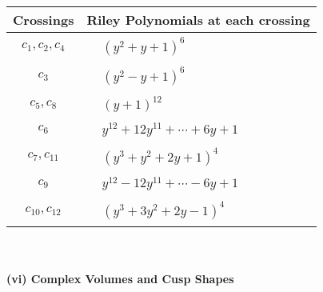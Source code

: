 \documentclass[1p]{elsarticle_modified}
\theoremstyle{definition}
\begin{document}
\begin{tabular}{m{50pt}|m{274pt}}
Crossings & \hspace{64pt}Riley Polynomials at each crossing \\
\hline $$\begin{aligned}c_{1},c_{2},c_{4}\end{aligned}$$&$\begin{aligned}
&(y^2+y+1)^6
\end{aligned}$\\
\hline $$\begin{aligned}c_{3}\end{aligned}$$&$\begin{aligned}
&(y^2- y+1)^6
\end{aligned}$\\
\hline $$\begin{aligned}c_{5},c_{8}\end{aligned}$$&$\begin{aligned}
&(y+1)^{12}
\end{aligned}$\\
\hline $$\begin{aligned}c_{6}\end{aligned}$$&$\begin{aligned}
&y^{12}+12 y^{11}+\cdots+6 y+1
\end{aligned}$\\
\hline $$\begin{aligned}c_{7},c_{11}\end{aligned}$$&$\begin{aligned}
&(y^3+y^2+2 y+1)^4
\end{aligned}$\\
\hline $$\begin{aligned}c_{9}\end{aligned}$$&$\begin{aligned}
&y^{12}-12 y^{11}+\cdots-6 y+1
\end{aligned}$\\
\hline $$\begin{aligned}c_{10},c_{12}\end{aligned}$$&$\begin{aligned}
&(y^3+3 y^2+2 y-1)^4
\end{aligned}$\\
\hline
\end{tabular}\\~\\
\newpage\flushleft \textbf{(vi) Complex Volumes and Cusp Shapes}
\end{document}
